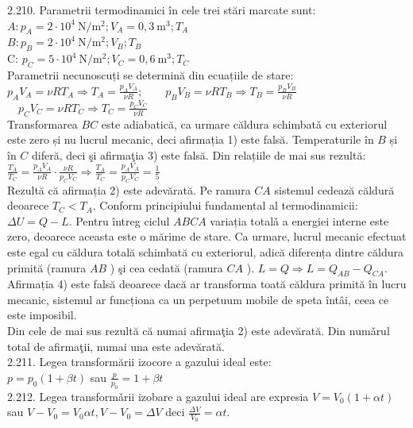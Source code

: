 2.210. Parametrii termodinamici în cele trei stări marcate sunt:\\ $A: p_{A}=2 \cdot 10^{4} \mathrm{~N} / \mathrm{m}^{2} ; V_{A}=0,3 \mathrm{~m}^{3} ; T_{A}$\\ $B: p_{B}=2 \cdot 10^{4} \mathrm{~N} / \mathrm{m}^{2} ; V_{B} ; T_{B}$\\ C: $p_{C}=5 \cdot 10^{4} \mathrm{~N} / \mathrm{m}^{2} ; V_{C}=0,6 \mathrm{~m}^{3} ; T_{C}$\\ Parametrii necunoscuți se determină din ecuațiile de stare:\\ $p_{A} V_{A}=\nu R T_{A} \Rightarrow T_{A}=\frac{p_{A} V_{A}}{\nu R} ; \quad \quad p_{B} V_{B}=\nu R T_{B} \Rightarrow T_{B}=\frac{p_{B} V_{B}}{\nu R}$\\ $\quad p_{C} V_{C}=\nu R T_{C} \Rightarrow T_{C}=\frac{p_{C} V_{C}}{\nu R}$\\ Transformarea $B C$ este adiabatică, ca urmare căldura schimbatǎ cu exteriorul este zero și nu lucrul mecanic, deci afirmația 1) este falsă. Temperaturile în $B$ și în $C$ diferă, deci şi afirmaţia 3) este falsă. Din relațiile de mai sus rezultă:\\ $\frac{T_{A}}{T_{C}}=\frac{p_{A} V_{A}}{\nu R} \cdot \frac{\nu R}{p_{C} V_{C}} \Rightarrow \frac{T_{A}}{T_{C}}=\frac{p_{A} V_{A}}{p_{C} V_{C}}=\frac{1}{5}$\\ Rezultă că afirmația 2) este adevărată. Pe ramura $C A$ sistemul cedează căldură deoarece $T_{C}<T_{A}$. Conform principiului fundamental al termodinamicii: $\Delta U=Q-L$. Pentru întreg ciclul $A B C A$ variația totalǎ a energiei interne este zero, deoarece aceasta este o mărime de stare. Ca urmare, lucrul mecanic efectuat este egal cu căldura totală schimbată cu exteriorul, adică diferența dintre căldura primită (ramura $A B$ ) şi cea cedată (ramura $C A$ ). $L=Q \Rightarrow L=Q_{A B}-Q_{C A}$. Afirmația 4) este falsă deoarece dacă ar transforma toată căldura primită în lucru mecanic, sistemul ar funcționa ca un perpetuum mobile de speta întâi, ceea ce este imposibil.\\ Din cele de mai sus rezultă că numai afirmaţia 2) este adevărată. Din numǎrul total de afirmaţii, numai una este adevărată.\\

2.211. Legea transformării izocore a gazului ideal este:\\ $p=p_{0}(1+\beta t)$ sau $\frac{p}{p_{0}}=1+\beta t$\\

2.212. Legea transformǎrii izobare a gazului ideal are expresia $V=V_{0}(1+\alpha t)$ sau $V-V_{0}=V_{0} \alpha t, V-V_{0}=\Delta V$ deci $\frac{\Delta V}{V_{0}}=\alpha t$.\\

